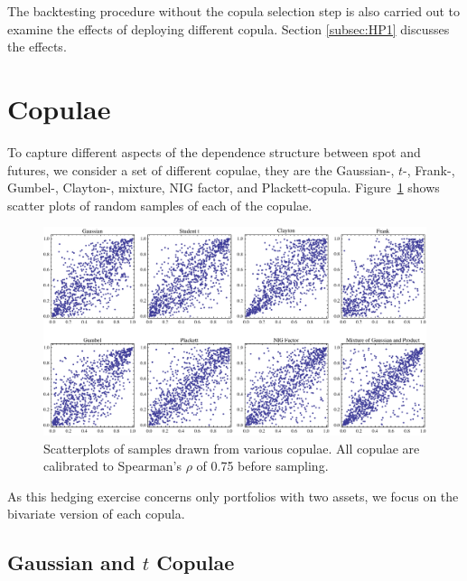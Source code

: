 The backtesting procedure without the copula selection step is also carried out to examine the effects of deploying different copula. 
Section \ref{subsec:HP1} discusses the effects. 

\section{Copulae}\label{sec:crm}
To capture different aspects of the dependence structure between spot and futures, we consider
a set of different copulae, 
they are the Gaussian-, $t$-, Frank-,
Gumbel-, Clayton-, mixture, NIG factor, and Plackett-copula. 
Figure~\ref{fig:copulaeScatterPlot} shows scatter plots of random
samples of each of the copulae. 
\begin{figure}[t]
    \centering
  \includegraphics[width=\textwidth]{_pics/copulas_scatterplots.pdf}
  \caption{Scatterplots of samples drawn from various copulae. All
    copulae are calibrated to Spearman's $\rho$ of 0.75 before
    sampling.}\label{fig:copulaeScatterPlot} 
\end{figure}

As this hedging exercise concerns only portfolios with two assets, we
focus on the bivariate version of each copula. 

\subsection{Gaussian and $t$ Copulae}\label{sec:ellpitical-copulae}

